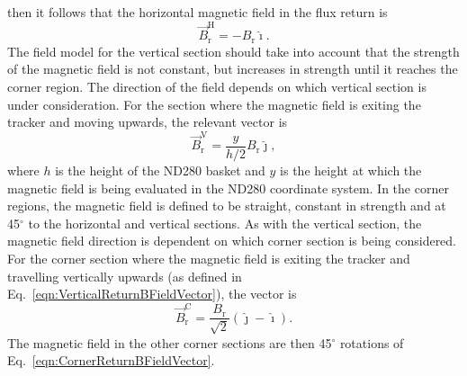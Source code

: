 then it follows that the horizontal magnetic field in the flux return is
\begin{equation}
  \overrightarrow{B}^{\textrm{H}}_{\textrm{r}} = -{B_{\textrm{r}}}\hat{\imath}.
  \label{eqn:HorizontalReturnBFieldVector}
\end{equation}
The field model for the vertical section should take into account that the strength of the magnetic field is not constant, but increases in strength until it reaches the corner region.  The direction of the field depends on which vertical section is under consideration.  For the section where the magnetic field is exiting the tracker and moving upwards, the relevant vector is
\begin{equation}
  \overrightarrow{B}^{\textrm{V}}_{\textrm{r}} = \frac{y}{h/2}{B_{\textrm{r}}}\hat{\jmath},
  \label{eqn:VerticalReturnBFieldVector}
\end{equation}
where $h$ is the height of the ND280 basket and $y$ is the height at which the magnetic field is being evaluated in the ND280 coordinate system.  In the corner regions, the magnetic field is defined to be straight, constant in strength and at 45$^\circ$ to the horizontal and vertical sections.  As with the vertical section, the magnetic field direction is dependent on which corner section is being considered.  For the corner section where the magnetic field is exiting the tracker and travelling vertically upwards (as defined in Eq.~\ref{eqn:VerticalReturnBFieldVector}), the vector is
\begin{equation}
  \overrightarrow{B}^{\textrm{C}}_{\textrm{r}} = \frac{B_{\textrm{r}}}{\sqrt{2}}(\hat{\jmath} - \hat{\imath}).
  \label{eqn:CornerReturnBFieldVector}
\end{equation}
The magnetic field in the other corner sections are then 45$^\circ$ rotations of Eq.~\ref{eqn:CornerReturnBFieldVector}.
\newline
\newline

